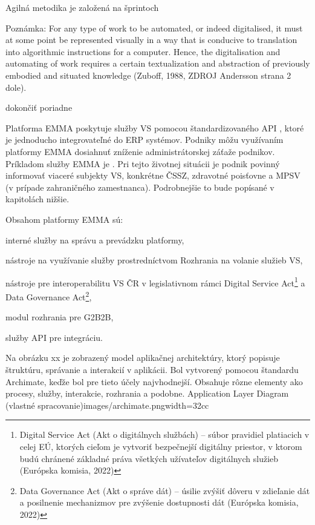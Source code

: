 Agilná metodika je založená na šprintoch

\TODO
Poznámka: 
For any type of work to be automated, or indeed digitalised, it must
at some point be represented visually in a way that is conducive to
translation into algorithmic instructions for a computer. Hence, the
digitalisation and automating of work requires a certain textualization
and abstraction of previously embodied and situated knowledge (Zuboff, 1988, ZDROJ Andersson strana 2 dole).

\TODO dokončiť poriadne

Platforma EMMA poskytuje služby VS pomocou štandardizovaného API
, ktoré je jednoducho integrovateľné do ERP systémov. Podniky môžu využívaním platformy EMMA dosiahnuť zníženie administrátorskej záťaže podnikov. Príkladom služby EMMA je . Pri tejto životnej situácii je podnik povinný informovať viaceré subjekty VS, konkrétne ČSSZ, zdravotné poisťovne a MPSV (v prípade zahraničného zamestnanca). Podrobnejšie to bude popísané v kapitolách nižšie.

Obsahom platformy EMMA sú:

\startitemize
\item{interné služby na správu a prevádzku platformy,}
\item{nástroje na využívanie služby prostredníctvom Rozhrania na volanie služieb VS,}
\item{nástroje pre interoperabilitu VS ČR v legislativnom rámci Digital Service Act\footnote{Digital Service Act (Akt o digitálnych službách) -- súbor pravidiel platiacich v celej EÚ, ktorých cieľom je vytvoriť bezpečnejší digitálny priestor, v ktorom budú chránené základné práva všetkých užívateľov digitálnych služieb \scr(Európska komisia, 2022)} a Data Governance Act\footnote{Data Governance Act (Akt o správe dát) -- úsilie zvýšiť dôveru v zdieľanie dát a posilnenie mechanizmov pre zvýšenie dostupnosti dát \scr(Európska komisia, 2022)},}
\item{modul rozhrania pre G2B2B,}
\item{služby API pre integráciu.}
\stopitemize 

Na obrázku xx je zobrazený model aplikačnej architektúry, ktorý popisuje štruktúru, správanie a interakcií v aplikácii. Bol vytvorený pomocou štandardu Archimate, keďže bol pre tieto účely najvhodnejší. Obsahuje rôzne elementy ako procesy, služby, interakcie, rozhrania a podobne.
{Application Layer Diagram (vlastné spracovanie)}{images/archimate.png}{width=32cc}

